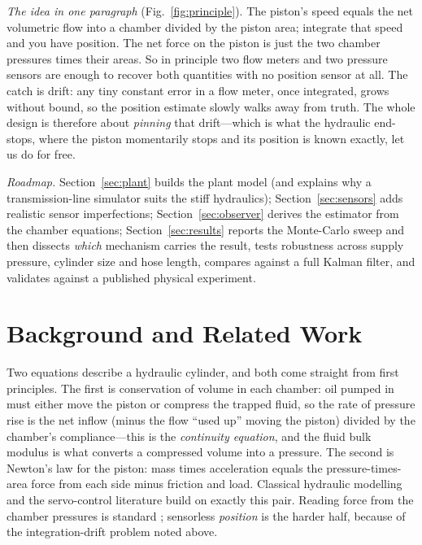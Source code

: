 \documentclass[conference]{IEEEtran}
\begin{document}
\emph{The idea in one paragraph} (Fig.~\ref{fig:principle}). The piston's speed
equals the net volumetric flow into a chamber divided by the piston area;
integrate that speed and you have position. The net force on the piston is just
the two chamber pressures times their areas. So in principle two flow meters and two pressure sensors are enough
to recover both quantities with no position sensor at all. The catch is drift: any
tiny constant error in a flow meter, once integrated, grows without bound, so the
position estimate slowly walks away from truth. The whole design is therefore
about \emph{pinning} that drift---which is what the hydraulic end-stops, where the
piston momentarily stops and its position is known exactly, let us do for free.

\emph{Roadmap.} Section~\ref{sec:plant} builds the plant model (and explains why a
transmission-line simulator suits the stiff hydraulics); Section~\ref{sec:sensors}
adds realistic sensor imperfections; Section~\ref{sec:observer} derives the
estimator from the chamber equations; Section~\ref{sec:results} reports the
Monte-Carlo sweep and then dissects \emph{which} mechanism carries the result,
tests robustness across supply pressure, cylinder size and hose length, compares
against a full Kalman filter, and validates against a published physical
experiment.

\section{Background and Related Work}
Two equations describe a hydraulic cylinder, and both come straight from
first principles. The first is conservation of volume in each chamber: oil pumped
in must either move the piston or compress the trapped fluid, so the rate of
pressure rise is the net inflow (minus the flow ``used up'' moving the piston)
divided by the chamber's compliance---this is the \emph{continuity equation}, and
the fluid bulk modulus is what converts a compressed volume into a pressure. The
second is Newton's law for the piston: mass times acceleration equals the
pressure-times-area force from each side minus friction and load. Classical
hydraulic modelling \cite{merritt1967,jelali2003hydraulic} and the servo-control
literature \cite{bobrow1998adaptive,alleyne2000force} build on exactly this pair.
Reading force from the chamber pressures is standard \cite{alleyne2000force};
sensorless \emph{position} is the harder half, because of the integration-drift
problem noted above.
\end{document}

